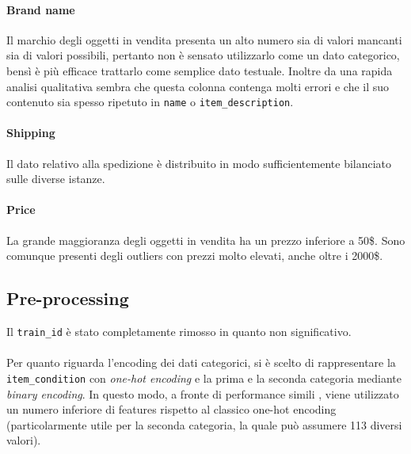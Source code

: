 \paragraph{Brand name} Il marchio degli oggetti in vendita presenta un alto numero sia di valori mancanti sia 
di valori possibili, pertanto non è sensato utilizzarlo come un dato categorico, bensì è più efficace trattarlo 
come semplice dato testuale. Inoltre da una rapida analisi qualitativa sembra che questa colonna contenga molti 
errori e che il suo contenuto sia spesso ripetuto in {\tt name} o {\tt item\_description}.

\paragraph{Shipping} Il dato relativo alla spedizione è distribuito in modo sufficientemente bilanciato
 sulle diverse istanze.

\paragraph{Price} La grande maggioranza degli oggetti in vendita ha un prezzo inferiore a 50\$. 
Sono comunque presenti degli outliers con prezzi molto elevati, anche oltre i 2000\$.

\subsection{Pre-processing}
Il {\tt train\_id} è stato completamente rimosso in quanto non significativo.

\paragraph{} Per quanto riguarda l'encoding dei dati categorici, si è scelto di rappresentare
la {\tt item\_condition} con \emph{one-hot encoding} e la prima e la seconda categoria 
mediante \emph{binary encoding}. In questo modo, a fronte di performance simili \cite{binary_enc},
viene utilizzato un numero inferiore di features rispetto al classico one-hot encoding
(particolarmente utile per la seconda categoria, la quale può assumere 113 diversi valori).

